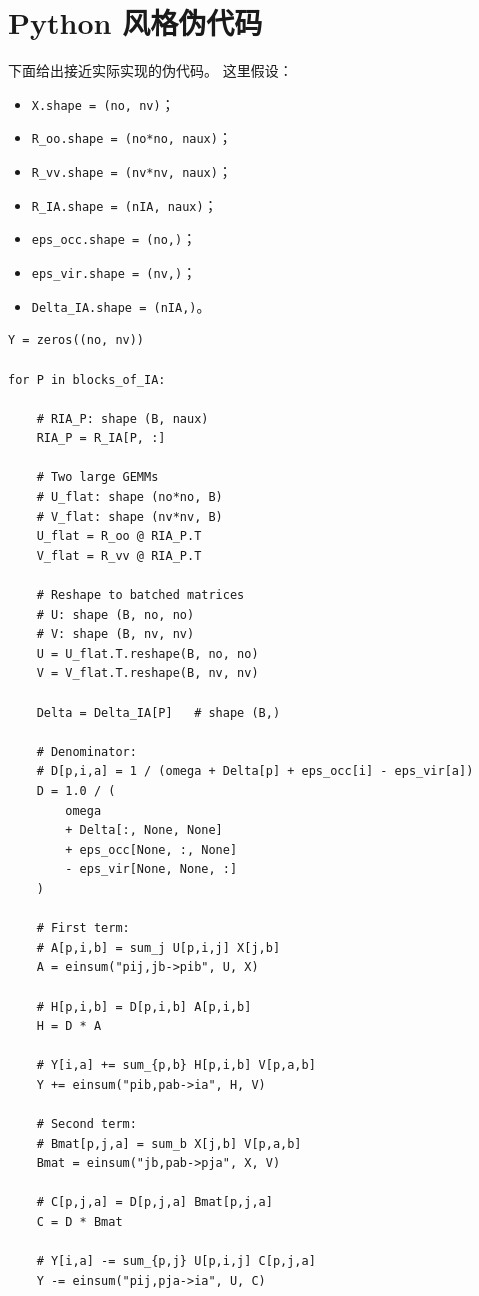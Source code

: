\documentclass[UTF8,a4paper,11pt]{ctexart}
\begin{document}
\section{Python 风格伪代码}

下面给出接近实际实现的伪代码。
这里假设：
\begin{itemize}
  \item \texttt{X.shape = (no, nv)}；
  \item \texttt{R\_oo.shape = (no*no, naux)}；
  \item \texttt{R\_vv.shape = (nv*nv, naux)}；
  \item \texttt{R\_IA.shape = (nIA, naux)}；
  \item \texttt{eps\_occ.shape = (no,)}；
  \item \texttt{eps\_vir.shape = (nv,)}；
  \item \texttt{Delta\_IA.shape = (nIA,)}。
\end{itemize}

\begin{verbatim}
Y = zeros((no, nv))

for P in blocks_of_IA:

    # RIA_P: shape (B, naux)
    RIA_P = R_IA[P, :]

    # Two large GEMMs
    # U_flat: shape (no*no, B)
    # V_flat: shape (nv*nv, B)
    U_flat = R_oo @ RIA_P.T
    V_flat = R_vv @ RIA_P.T

    # Reshape to batched matrices
    # U: shape (B, no, no)
    # V: shape (B, nv, nv)
    U = U_flat.T.reshape(B, no, no)
    V = V_flat.T.reshape(B, nv, nv)

    Delta = Delta_IA[P]   # shape (B,)

    # Denominator:
    # D[p,i,a] = 1 / (omega + Delta[p] + eps_occ[i] - eps_vir[a])
    D = 1.0 / (
        omega
        + Delta[:, None, None]
        + eps_occ[None, :, None]
        - eps_vir[None, None, :]
    )

    # First term:
    # A[p,i,b] = sum_j U[p,i,j] X[j,b]
    A = einsum("pij,jb->pib", U, X)

    # H[p,i,b] = D[p,i,b] A[p,i,b]
    H = D * A

    # Y[i,a] += sum_{p,b} H[p,i,b] V[p,a,b]
    Y += einsum("pib,pab->ia", H, V)

    # Second term:
    # Bmat[p,j,a] = sum_b X[j,b] V[p,a,b]
    Bmat = einsum("jb,pab->pja", X, V)

    # C[p,j,a] = D[p,j,a] Bmat[p,j,a]
    C = D * Bmat

    # Y[i,a] -= sum_{p,j} U[p,i,j] C[p,j,a]
    Y -= einsum("pij,pja->ia", U, C)
\end{verbatim}
\end{document}
